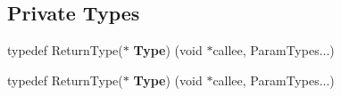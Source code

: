 \subsection*{Private Types}
\begin{DoxyCompactItemize}
\item 
typedef Return\+Type($\ast$ {\bfseries Type}) (void $\ast$callee, Param\+Types...)\hypertarget{class_ensum_1_1_utils_1_1_delegate_3_01_return_type_07_param_types_8_8_8_08_4_a2a7c0af5bb292262a83fb30e7126eaf1}{}\label{class_ensum_1_1_utils_1_1_delegate_3_01_return_type_07_param_types_8_8_8_08_4_a2a7c0af5bb292262a83fb30e7126eaf1}

\item 
typedef Return\+Type($\ast$ {\bfseries Type}) (void $\ast$callee, Param\+Types...)\hypertarget{class_ensum_1_1_utils_1_1_delegate_3_01_return_type_07_param_types_8_8_8_08_4_a2a7c0af5bb292262a83fb30e7126eaf1}{}\label{class_ensum_1_1_utils_1_1_delegate_3_01_return_type_07_param_types_8_8_8_08_4_a2a7c0af5bb292262a83fb30e7126eaf1}

\end{DoxyCompactItemize}
